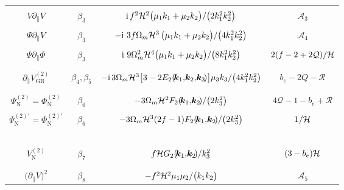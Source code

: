\begin{longtable}{| c | c | c | c |}
\hline 
&  &  & \\
$V\partial_{\parallel}V $ & $\beta_{3}$ & $ \mathrm{i}\,f^{2}\mathcal{H}^{2}
{\big(\mu_{1}k_{1} + \mu_{2}k_{2}\big)}/{\big(2k_{1}^{2}k_{2}^{2}\big)}$ &  $\mathcal{A}_{3}$ \\ 
&  &  & \\
$\Psi\partial_{\parallel}V$ & $\beta_{3}$ & $-{\mathrm{i\,}}\,3f\Omega_{m}\mathcal{H}^{3}\,{\big(\mu_{1}k_{1} + \mu_{2}k_{2}\big)}/{\big(4k_{1}^{2}k_{2}^{2}\big)}$ & $\mathcal{A}_{4}$ \\ 
&  &  & \\
$\Psi\partial_{\parallel}\Phi$ & $\beta_{3}$ & ${\mathrm{i\,}}\,9\Omega_{m}^{2}\mathcal{H}^{4}{\big(\mu_{1}k_{1} + \mu_{2}k_{2}\big)}/{\big(8k_{1}^{2}k_{2}^{2}\big)}$ & ${2}(f-2+2\mathcal{Q})/{\mathcal{H}}$  \\ 
&  &  & \\
\hline
&  &  & \\ 
${\partial_{\parallel}V^{(2)}_{\mathrm{GR}}}$ & $\beta_{4},\beta_{5}$ & $-\mathrm{i}\,3\Omega_{m}\mathcal{H}^{3}\big[3 -2 E_{2}(\!\bm{k}_{1},\!\bm{k}_{2},\!\bm{k}_{3}\!)\big]\mu_3 k_3/\big(4k_{1}^{2}k_{2}^{2}\big)$ & $b_{e}-2Q-\mathcal{R}$ \\
&  &  & \\
\hline
&  &  & \\ 
${\Psi^{(2)}_{\mathrm{N}}=\Phi^{(2)}_{\mathrm{N}}}$ & $\beta_{6}$ & $-{3}\Omega_{m}{\mathcal{H}^{2}}F_{2}(\!\bm{k}_{1},\!\bm{k}_{2}\!)/{\big(2k_{3}^{2}\big)}$ & $4\mathcal{Q}-1-b_{e}+\mathcal{R}$ \\
&  &  & \\ 
${\Psi_{\mathrm{N}}^{(2)\prime} = \Phi_{\mathrm{N}}^{(2)\prime}}$  & $\beta_{6}$ & $-{3}\Omega_{m}{\mathcal{H}^{3}}(2f-1)F_{2}(\!\bm{k}_{1},\!\bm{k}_{2}\!)/{\big(2k_{3}^{2}\big)}$ & ${1}/{\mathcal{H}}$ \\
&  &  & \\ 
\hline\
&  &  & \\ 
$V^{(2)}_{\mathrm{N}}$ & $\beta_{7}$ & $f{\mathcal{H}}G_{2}(\!\bm{k}_{1},\!\bm{k}_{2}\!)/{k_{3}^{2}}$ & $(3-b_{e})\mathcal{H}$ \\ 
&  &  & \\
\hline 
&  &  & \\
$\big(\partial_{\parallel}V\big)^{2} $ & $\beta_{8}$ & $-f^{2}\mathcal{H}^{2}{\mu_{1}\mu_{2}}/{\big(k_{1}k_{2}\big)}$ & $\mathcal{A}_{5}$ \\

\end{longtable}
